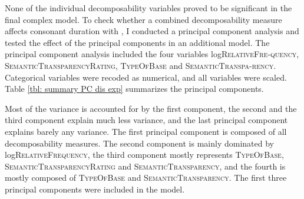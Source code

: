 None of the individual decomposability variables proved to be significant in the final complex model. To check whether a combined decomposability measure affects consonant duration with , I conducted a principal component analysis and tested the effect of the principal components in an additional model. The principal component analysis included the four variables log\textsc{RelativeFre-quency}, \textsc{SemanticTransparencyRating}, \textsc{TypeOfBase} and \textsc{SemanticTranspa-rency}. Categorical variables were recoded as numerical, and all variables were scaled. Table \ref{tbl: summary PC dis exp} summarizes the principal components.



\begin{table}[b!]
	\caption{ Summary of principal components}
	\label{tbl: summary PC dis exp}
	\begin{center}
	\end{center}
\end{table}


Most of the variance is accounted for by the first component, the second and the third component explain much less variance, and the last principal component explains barely any variance. 
The first principal component is composed of all decomposability measures. The second component is mainly dominated by log\textsc{RelativeFrequency}, the third component mostly represents \textsc{TypeOfBase}, \textsc{SemanticTransparencyRating} and \textsc{SemanticTransparency}, and the fourth is mostly composed of \textsc{TypeOfBase} and \textsc{SemanticTransparency}. The first three principal components were included in the model.


